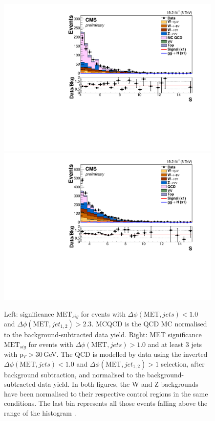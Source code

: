 \begin{figure}[!htb]
\centering
\includegraphics[width=.49\textwidth]{Chapter07/Images/output_invqcd_qcd_metnomu_significance.pdf}
\includegraphics[width=.49\textwidth]{Chapter07/Images/output_invqcd_3j_nunu_metnomu_significance.pdf}
\caption{Left: \MET significance $\text{MET}_{sig}$ for events with $\Delta\phi(\text{MET},jets)<1.0$ and $\Delta\phi(\text{MET},jet_{1,2})>2.3$. MCQCD is the QCD MC normalised to the background-subtracted data yield. Right: \gls{MET} significance $\text{MET}_{sig}$ for events with $\Delta\phi(\text{MET},jets)>1.0$ and at least 3 jets with p$_T>30$\,GeV. The QCD is modelled by data using the inverted $\Delta\phi(\text{MET},jets)<1.0$ and $\Delta\phi(\text{MET},jet_{1,2})>1$ selection, after background subtraction, and normalised to the background-subtracted data yield. In both figures, the W and Z backgrounds have been normalised to their respective control regions in the same conditions. The last bin represents all those events falling above the range of the histogram \cite{ARTICLE:CMSVBFHiggsInvisibleParkedAnalysisPAS}.}
\label{fig:invqcd}
\end{figure}

%

